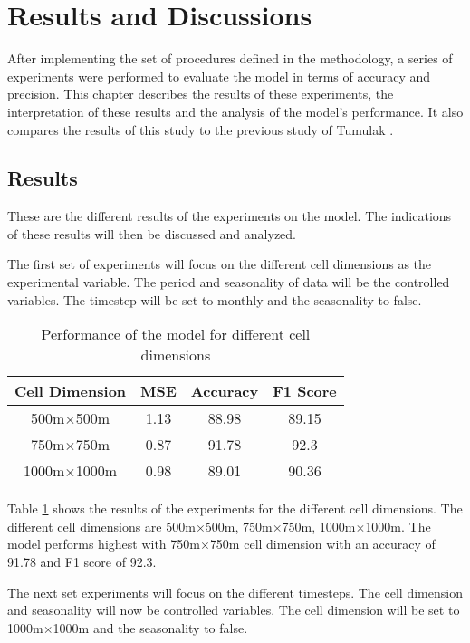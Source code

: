 \section{Results and Discussions}
    After implementing the set of procedures defined in the methodology, a series of experiments were performed to evaluate the model in terms of accuracy and precision. This chapter describes the results of these experiments, the interpretation of these results and the analysis of the model's performance. It also compares the results of this study to the previous study of Tumulak \cite{tumulak2015crime}.
\subsection{Results}
    These are the different results of the experiments on the model. The indications of these results will then be discussed and analyzed.

    The first set of experiments will focus on the different cell dimensions as the experimental variable. The period and seasonality of data will be the controlled variables. The timestep will be set to monthly and the seasonality to false.

    \begin{table}[H]
      \centering
      \begin{tabular}{|c|c|c|c|}
            \hline
          \textbf{Cell Dimension}  &\textbf{MSE}  &\textbf{Accuracy} &\textbf{F1 Score}\\ 
          \hline
          500m\(\times\)500m &1.13 &88.98 &89.15 \\
          750m\(\times\)750m &0.87 &91.78 &92.3 \\
          1000m\(\times\)1000m  &0.98 &89.01 &90.36 \\
          \hline
        \end{tabular}
      \caption{Performance of the model for different cell dimensions}
      \label{table:dimension-results}
    \end{table}
    Table \ref{table:dimension-results} shows the results of the experiments for the different cell dimensions. The different cell dimensions are 500m\(\times\)500m, 750m\(\times\)750m, 1000m\(\times\)1000m. The model performs highest with 750m\(\times\)750m cell dimension with an accuracy of 91.78 and F1 score of 92.3.

    The next set experiments will focus on the different timesteps. The cell dimension and seasonality will now be controlled variables. The cell dimension will be set to 1000m\(\times\)1000m and the seasonality to false.

